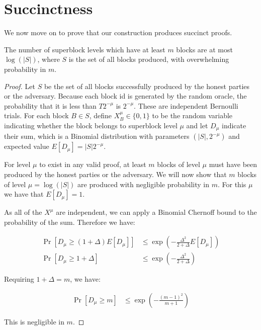 \section{Succinctness}

We now move on to prove that our construction produces succinct proofs.

\begin{theorem}
    \label{thm.few-levels}
    The number of superblock levels which have at least $m$ blocks are at most
    $\log(|S|)$, where $S$ is the set of all blocks produced, with overwhelming
    probability in $m$.
\end{theorem}

\begin{proof}
    Let $S$ be the set of all blocks successfully produced by the honest
    parties or the adversary. Because each block id is generated by the random
    oracle, the probability that it is less than $T 2^{-\mu}$ is
    $2^{-\mu}$. These are independent Bernoulli trials. For each block
    $B \in S$, define $X^{\mu}_B \in \{0, 1\}$ to be the random variable
    indicating whether the block belongs to superblock level $\mu$ and let
    $D_\mu$ indicate their sum, which is a Binomial distribution with
    parameters $(|S|, 2^{-\mu})$ and expected value $E[D_{\mu}] =
    |S| 2^{-\mu}$.

    For level $\mu$ to exist in any valid proof, at least $m$ blocks of level
    $\mu$ must have been produced by the honest parties or the adversary. We
    will now show that $m$ blocks of level $\mu = \log(|S|)$ are produced with
    negligible probability in $m$. For this $\mu$ we have that $E[D_\mu] = 1$.

    As all of the $X^{\mu}$ are independent, we can apply a Binomial Chernoff
    bound to the probability of the sum. Therefore we have:

    \begin{align*}
        \Pr[D_\mu \geq (1 + \Delta)E[D_\mu]] &\leq \exp(-\frac{\Delta^2}{2 + \Delta}E[D_\mu]) \\
        \Pr[D_\mu \geq 1 + \Delta] &\leq \exp(-\frac{\Delta^2}{2 + \Delta})
    \end{align*}

    Requiring $1 + \Delta = m$, we have:

    \begin{align*}
        \Pr[D_\mu \geq m] &\leq \exp(-\frac{(m - 1)^2}{m + 1})
    \end{align*}

    This is negligible in $m$.
\end{proof}

